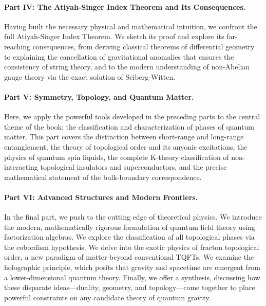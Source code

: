 \paragraph{Part IV: The Atiyah-Singer Index Theorem and Its Consequences.} Having built the necessary physical and mathematical intuition, we confront the full Atiyah-Singer Index Theorem. We sketch its proof and explore its far-reaching consequences, from deriving classical theorems of differential geometry to explaining the cancellation of gravitational anomalies that ensures the consistency of string theory, and to the modern understanding of non-Abelian gauge theory via the exact solution of Seiberg-Witten.

\paragraph{Part V: Symmetry, Topology, and Quantum Matter.} Here, we apply the powerful tools developed in the preceding parts to the central theme of the book: the classification and characterization of phases of quantum matter. This part covers the distinction between short-range and long-range entanglement, the theory of topological order and its anyonic excitations, the physics of quantum spin liquids, the complete K-theory classification of non-interacting topological insulators and superconductors, and the precise mathematical statement of the bulk-boundary correspondence.

\paragraph{Part VI: Advanced Structures and Modern Frontiers.} In the final part, we push to the cutting edge of theoretical physics. We introduce the modern, mathematically rigorous formulation of quantum field theory using factorization algebras. We explore the classification of all topological phases via the cobordism hypothesis. We delve into the exotic physics of fracton topological order, a new paradigm of matter beyond conventional TQFTs. We examine the holographic principle, which posits that gravity and spacetime are emergent from a lower-dimensional quantum theory. Finally, we offer a synthesis, discussing how these disparate ideas---duality, geometry, and topology---come together to place powerful constraints on any candidate theory of quantum gravity.
